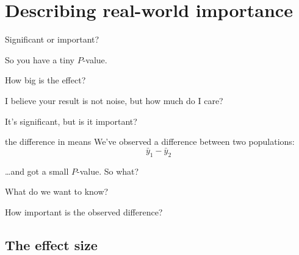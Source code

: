 \section{Describing real-world importance}

\begin{frame}{Significant or important?}
    \vfill

    So you have a \alert{tiny $P$-value}.

    \vfill

    How big is the effect?

    \vfill
    \pause

     I believe your result is not noise,
    but how much \alert{do I care?}

\end{frame}

\begin{frame}{It's significant, but is it important?}


    \begin{block}{the difference in means}
        We've observed a difference between two populations:
        \[  \bar y_1 - \bar y_2 \]
    \end{block}

    \ldots and got a small $P$-value.  So what?

    \vspace{2em}

     What do we want to know?\\

    \vspace{2em}

    How important is the observed difference?


\end{frame}


\subsection{The effect size}

